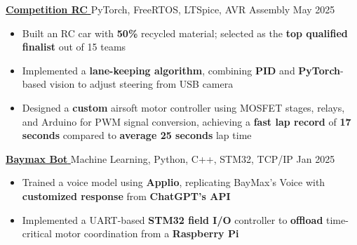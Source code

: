 \documentclass[10pt]{article}
\begin{document}
\noindent\href{https://github.com/RyanQin24/FormulaNULL-MotorDrivers?tab=readme-ov-file}{\textbf{Competition RC \footnotesize\faExternalLink*}} \hspace{\WEVBsep}\textbar\hspace{\WEVBsep} PyTorch, FreeRTOS, LTSpice, AVR Assembly \hfill May 2025 \\[\PTtPsep]
\begin{itemize}
    \item  Built an RC car with \textbf{50\%} recycled material; selected as the \textbf{top qualified finalist} out of 15 teams \\[\PtPsep]
    \item  Implemented a \textbf{lane-keeping algorithm}, combining \textbf{PID} and \textbf{PyTorch}-based vision to adjust steering from USB camera \\[\PtPsep]
    \item  Designed a \textbf{custom} airsoft motor controller using MOSFET stages, relays, and Arduino for PWM signal conversion, achieving a \textbf{fast lap record} of \textbf{17 seconds} compared to \textbf{average 25 seconds} lap time \\[\PStPSsep]
\end{itemize}

\noindent\href{https://dorahacks.io/buidl/21720/}{\textbf{Baymax Bot \footnotesize\faExternalLink*}} \hspace{\WEVBsep}\textbar\hspace{\WEVBsep} Machine Learning, Python, C++, STM32, TCP/IP \hfill Jan 2025 \\[\PTtPsep]
\begin{itemize}
    \item  Trained a voice model using \textbf{Applio}, replicating BayMax’s Voice with \textbf{customized response} from \textbf{ChatGPT’s API} \\[\PtPsep]
    \item  Implemented a UART-based \textbf{STM32 field I/O} controller to \textbf{offload} time-critical motor coordination from a \textbf{Raspberry Pi} \\[\PStPSsep]
\end{itemize}
\end{document}
